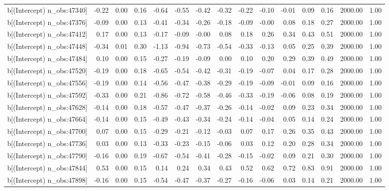 \begin{table}[ht]
\begin{tabular}{rrrrrrrrrrrrrrr}
  b[(Intercept) n\_obs:47340] & -0.22 & 0.00 & 0.16 & -0.64 & -0.55 & -0.42 & -0.32 & -0.22 & -0.10 & -0.01 & 0.09 & 0.16 & 2000.00 & 1.00 \\ 
  b[(Intercept) n\_obs:47376] & -0.09 & 0.00 & 0.13 & -0.41 & -0.34 & -0.26 & -0.18 & -0.09 & -0.00 & 0.08 & 0.18 & 0.27 & 2000.00 & 1.00 \\ 
  b[(Intercept) n\_obs:47412] & 0.17 & 0.00 & 0.13 & -0.17 & -0.09 & -0.00 & 0.08 & 0.18 & 0.26 & 0.34 & 0.43 & 0.51 & 2000.00 & 1.00 \\ 
  b[(Intercept) n\_obs:47448] & -0.34 & 0.01 & 0.30 & -1.13 & -0.94 & -0.73 & -0.54 & -0.33 & -0.13 & 0.05 & 0.25 & 0.39 & 2000.00 & 1.00 \\ 
  b[(Intercept) n\_obs:47484] & 0.10 & 0.00 & 0.15 & -0.27 & -0.19 & -0.09 & 0.00 & 0.10 & 0.20 & 0.29 & 0.39 & 0.49 & 2000.00 & 1.00 \\ 
  b[(Intercept) n\_obs:47520] & -0.19 & 0.00 & 0.18 & -0.65 & -0.54 & -0.42 & -0.31 & -0.19 & -0.07 & 0.04 & 0.17 & 0.28 & 2000.00 & 1.00 \\ 
  b[(Intercept) n\_obs:47556] & -0.19 & 0.00 & 0.14 & -0.56 & -0.47 & -0.38 & -0.29 & -0.19 & -0.09 & -0.01 & 0.09 & 0.16 & 2000.00 & 1.00 \\ 
  b[(Intercept) n\_obs:47592] & -0.33 & 0.00 & 0.21 & -0.86 & -0.72 & -0.58 & -0.46 & -0.33 & -0.19 & -0.06 & 0.08 & 0.19 & 2000.00 & 1.00 \\ 
  b[(Intercept) n\_obs:47628] & -0.14 & 0.00 & 0.18 & -0.57 & -0.47 & -0.37 & -0.26 & -0.14 & -0.02 & 0.09 & 0.23 & 0.34 & 2000.00 & 1.00 \\ 
  b[(Intercept) n\_obs:47664] & -0.14 & 0.00 & 0.15 & -0.49 & -0.43 & -0.34 & -0.24 & -0.14 & -0.04 & 0.05 & 0.14 & 0.24 & 2000.00 & 1.00 \\ 
  b[(Intercept) n\_obs:47700] & 0.07 & 0.00 & 0.15 & -0.29 & -0.21 & -0.12 & -0.03 & 0.07 & 0.17 & 0.26 & 0.35 & 0.43 & 2000.00 & 1.00 \\ 
  b[(Intercept) n\_obs:47736] & 0.03 & 0.00 & 0.13 & -0.33 & -0.23 & -0.15 & -0.06 & 0.03 & 0.12 & 0.20 & 0.28 & 0.34 & 2000.00 & 1.00 \\ 
  b[(Intercept) n\_obs:47790] & -0.16 & 0.00 & 0.19 & -0.67 & -0.54 & -0.41 & -0.28 & -0.15 & -0.02 & 0.09 & 0.21 & 0.30 & 2000.00 & 1.00 \\ 
  b[(Intercept) n\_obs:47844] & 0.53 & 0.00 & 0.15 & 0.14 & 0.24 & 0.34 & 0.43 & 0.52 & 0.62 & 0.72 & 0.83 & 0.91 & 2000.00 & 1.00 \\ 
  b[(Intercept) n\_obs:47898] & -0.16 & 0.00 & 0.15 & -0.54 & -0.47 & -0.37 & -0.27 & -0.16 & -0.06 & 0.03 & 0.14 & 0.21 & 2000.00 & 1.00 \\ 

\end{tabular}
\end{table}
